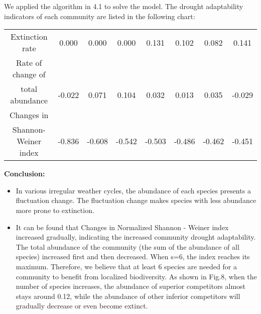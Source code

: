 \documentclass{mcmthesis}
\begin{document}
We applied the algorithm in 4.1 to solve the model. The drought adaptability indicators of each community are listed in the following chart:

\begin{table}[h]\label{table1}
	\begin{center}
		\begin{tabular}{cccccccc}
			\hline
			\makebox[0.3\textwidth][c]{Species Num}	& 
			\makebox[0.07\textwidth][c]{2}	& 
			\makebox[0.07\textwidth][c]{4}	& 
			\makebox[0.07\textwidth][c]{6}	& 
			\makebox[0.07\textwidth][c]{8}	& 
			\makebox[0.07\textwidth][c]{10}	& 
			\makebox[0.07\textwidth][c]{12}	& 
			\makebox[0.07\textwidth][c]{14}	
			\\ \hline
			Extinction rate &0.000&0.000&0.000&0.131&0.102&0.082&0.141 \\
			\hline
			Rate of change of \\total abundance & -0.022&0.071&0.104&0.032&0.013&0.035&-0.029 \\
			\hline
			Changes in \\Shannon-Weiner index & -0.836&-0.608&-0.542&-0.503&-0.486&-0.462&-0.451 \\
			\hline
		\end{tabular}
	\end{center}
\end{table}

\textbf{Conclusion:}

\begin{itemize}
	\item In various irregular weather cycles, the abundance of each species presents a fluctuation change. The fluctuation change makes species with less abundance more prone to extinction.
	
	\item It can be found that Changes in Normalized Shannon - Weiner index increased gradually, indicating the increased community drought adaptability. The total abundance of the community (the sum of the abundance of all species) increased first and then decreased. When s=6, the index reaches its maximum. Therefore, we believe that at least 6 species are needed for a community to benefit from localized biodiversity. As shown in Fig.8, when the number of species increases, the abundance of superior competitors almost stays around 0.12, while the abundance of other inferior competitors will gradually decrease or even become extinct.
	

	
\end{itemize}
\end{document}
